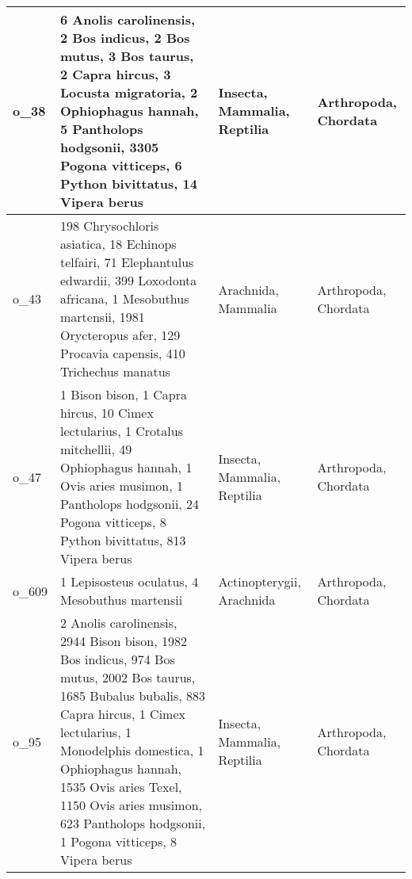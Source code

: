 {\begin{longtable}{| C{1.5cm} | L{8.4cm} | L{2.4cm} | L{2.4cm} |}
		o\_38 & 6 Anolis carolinensis, 2 Bos indicus, 2 Bos mutus, 3 Bos taurus, 2 Capra hircus, 3 Locusta migratoria, 2 Ophiophagus hannah, 5 Pantholops hodgsonii, 3305 Pogona vitticeps, 6 Python bivittatus, 14 Vipera berus & Insecta, Mammalia, Reptilia & Arthropoda, Chordata  \\ \hline
		o\_43 & 198 Chrysochloris asiatica, 18 Echinops telfairi, 71 Elephantulus edwardii, 399 Loxodonta africana, 1 Mesobuthus martensii, 1981 Orycteropus afer, 129 Procavia capensis, 410 Trichechus manatus & Arachnida, Mammalia & Arthropoda, Chordata   \\ \hline		
		o\_47 & 1 Bison bison, 1 Capra hircus, 10 Cimex lectularius, 1 Crotalus mitchellii, 49 Ophiophagus hannah, 1 Ovis aries musimon, 1 Pantholops hodgsonii, 24 Pogona vitticeps, 8 Python bivittatus, 813 Vipera berus & Insecta, Mammalia, Reptilia & Arthropoda, Chordata  \\ \hline
		o\_609 & 1 Lepisosteus oculatus, 4 Mesobuthus martensii & Actinopterygii, Arachnida & Arthropoda, Chordata  \\ \hline
		o\_95 & 2 Anolis carolinensis, 2944 Bison bison, 1982 Bos indicus, 974 Bos mutus, 2002 Bos taurus, 1685 Bubalus bubalis, 883 Capra hircus, 1 Cimex lectularius, 1 Monodelphis domestica, 1 Ophiophagus hannah, 1535 Ovis aries Texel, 1150 Ovis aries musimon, 623 Pantholops hodgsonii, 1 Pogona vitticeps, 8 Vipera berus & Insecta, Mammalia, Reptilia &  Arthropoda, Chordata \\ \hline			


\end{longtable}}
